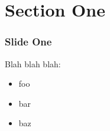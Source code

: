 \documentclass[11pt,xcolor=dvipsnames]{beamer}
\begin{document}



\section{Section One}

\begin{frame}[fragile]
  \frametitle{Slide One}
  Blah blah blah:
  \begin{itemize}
  \item foo
  \item bar
  \item baz
  \end{itemize}
\end{frame}
\end{document}
